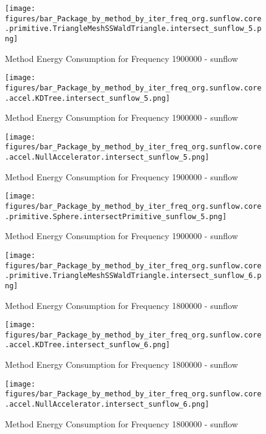 				\begin{figure}[H]
				\centering
				\texttt{[image: figures/bar\_Package\_by\_method\_by\_iter\_freq\_org.sunflow.core.primitive.TriangleMeshSSWaldTriangle.intersect\_sunflow\_5.png]}
				\caption{Method Energy Consumption for Frequency 1900000 - sunflow}				
				\end{figure}				
				
				\begin{figure}[H]
				\centering
				\texttt{[image: figures/bar\_Package\_by\_method\_by\_iter\_freq\_org.sunflow.core.accel.KDTree.intersect\_sunflow\_5.png]}
				\caption{Method Energy Consumption for Frequency 1900000 - sunflow}				
				\end{figure}				
				
				\begin{figure}[H]
				\centering
				\texttt{[image: figures/bar\_Package\_by\_method\_by\_iter\_freq\_org.sunflow.core.accel.NullAccelerator.intersect\_sunflow\_5.png]}
				\caption{Method Energy Consumption for Frequency 1900000 - sunflow}				
				\end{figure}				
				
				\begin{figure}[H]
				\centering
				\texttt{[image: figures/bar\_Package\_by\_method\_by\_iter\_freq\_org.sunflow.core.primitive.Sphere.intersectPrimitive\_sunflow\_5.png]}
				\caption{Method Energy Consumption for Frequency 1900000 - sunflow}				
				\end{figure}				
				
				\begin{figure}[H]
				\centering
				\texttt{[image: figures/bar\_Package\_by\_method\_by\_iter\_freq\_org.sunflow.core.primitive.TriangleMeshSSWaldTriangle.intersect\_sunflow\_6.png]}
				\caption{Method Energy Consumption for Frequency 1800000 - sunflow}				
				\end{figure}				
				
				\begin{figure}[H]
				\centering
				\texttt{[image: figures/bar\_Package\_by\_method\_by\_iter\_freq\_org.sunflow.core.accel.KDTree.intersect\_sunflow\_6.png]}
				\caption{Method Energy Consumption for Frequency 1800000 - sunflow}				
				\end{figure}				
				
				\begin{figure}[H]
				\centering
				\texttt{[image: figures/bar\_Package\_by\_method\_by\_iter\_freq\_org.sunflow.core.accel.NullAccelerator.intersect\_sunflow\_6.png]}
				\caption{Method Energy Consumption for Frequency 1800000 - sunflow}				
				\end{figure}				
				
